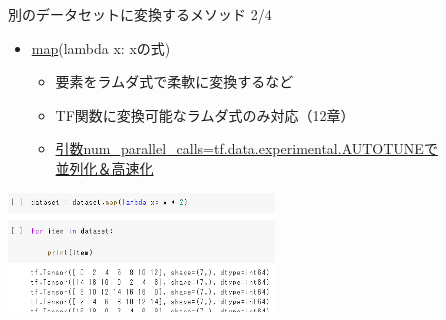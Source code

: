 \documentclass[aspectratio=169, dvipdfmx, 14pt, xcolor={svgnames,dvipsnames}, t]{beamer}
\begin{document}

\begin{frame}{別のデータセットに変換するメソッド 2/4}\label{ux5225ux306eux30c7ux30fcux30bfux30bbux30c3ux30c8ux306bux5909ux63dbux3059ux308bux30e1ux30bdux30c3ux30c9-24}

  \begin{itemize}
    \tightlist
    \item
          \href{https://qiita.com/conf8o/items/0cb02bc504b51af09099}{map}(lambda
          x: xの式)

          \begin{itemize}
            \tightlist
            \item
                  \alert{要素をラムダ式で柔軟に変換する}など
            \item
                  TF関数に変換可能なラムダ式のみ対応（12章）
            \item
                  \href{https://tensorflow.classcat.com/2019/03/23/tf20-alpha-guide-data-performance/}{引数num\_parallel\_calls=tf.data.experimental.AUTOTUNEで\\並列化＆高速化}
          \end{itemize}
  \end{itemize}
  \centering
  \includegraphics[width=200pt]{img/hands-on-ml_13-1-1_3.png}
\end{frame}

\end{document}
